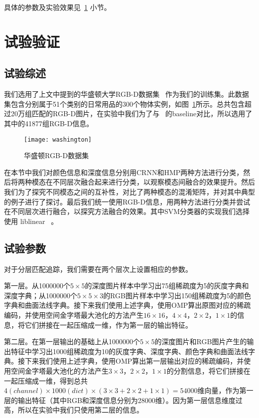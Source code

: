 具体的参数及实验效果见~\ref{sec:fStrategyExp} 小节。


\section{试验验证}
\label{sec:fStrategyExp}

\subsection{试验综述}

我们选用了上文中提到的华盛顿大学RGB-D数据集~ 作为我们的训练集。此数据集包含分别属于51个类别的日常用品的300个物体实例，如图~\ref{fig:washington}所示。总共包含超过20万组匹配的RGB-D图片，在实验中我们为了与~ 的baseline对比，所以选用了其中的41877组RGB-D信息。

\begin{figure}[H] %
  \centering
  \texttt{[image: washington]}
  \caption{华盛顿RGB-D数据集}
  \label{fig:washington}
\end{figure}

在本节中我们对颜色信息和深度信息分别用CRNN和HMP两种方法进行分类，然后将两种模态在不同层次融合起来进行分类，以观察模态间融合的效果提升。然后我们为了探究不同模态之间的互补性，对比了两种模态的混淆矩阵，并对其中典型的例子进行了探讨。最后我们统一使用RGB-D信息，用两种方法进行分类并尝试在不同层次进行融合，以探究方法融合的效果。其中SVM分类器的实现我们选择使用 liblinear~ 。

\subsection{试验参数}

对于分层匹配追踪，我们需要在两个层次上设置相应的参数。

第一层。从1000000个$5 \times 5$的深度图片样本中学习出75组稀疏度为5的灰度字典和深度字典；从1000000个$5 \times 5 \times 3$的RGB图片样本中学习出150组稀疏度为5的颜色字典和曲面法线字典。接下来我们使用上述字典，使用OMP算出原图对应的稀疏编码，并使用空间金字塔最大池化的方法产生$16 \times 16$，$4 \times 4$，$2 \times 2$，$1 \times 1$的信息，将它们拼接在一起压缩成一维，作为第一层的输出特征。

第二层。在第一层输出的基础上从1000000个$5 \times 5$的深度图片和RGB图片产生的输出特征中学习出1000组稀疏度为10的灰度字典、深度字典、颜色字典和曲面法线字典。接下来我们使用上述字典，使用OMP算出第一层输出对应的稀疏编码，并使用空间金字塔最大池化的方法产生$3 \times 3$，$2 \times 2$，$1 \times 1$的分割信息，将它们拼接在一起压缩成一维，得到总共$4(channel) \times 1000(dict) \times (3 \times 3 + 2 \times 2 + 1 \times 1) = 54000$维向量，作为第一层的输出特征（其中RGB和深度信息分别为28000维）。因为第一层信息维度过高，所以在实验中我们只使用第二层的信息。

